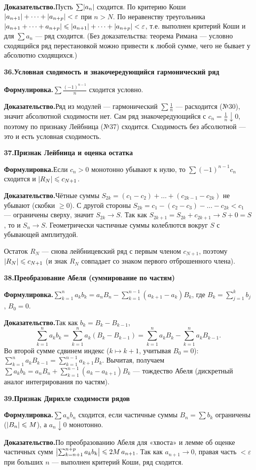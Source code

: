 \documentclass[10pt,a4paper]{article}
\newcommand{\eps}{\varepsilon}
\renewcommand{\le}{\leqslant}
\renewcommand{\ge}{\geqslant}
\DeclarePairedDelimiter{\abs}{\lvert}{\rvert}
\theoremstyle{definition}
\theoremstyle{plain}
\newcommand{\writespace}{\vspace{7.5mm}}
\newcommand{\prf}[2]{%
  \par\writespace\noindent
  {\large\bfseries\color{accent}#1.\enspace #2}\par\smallskip}
\newcommand{\stmt}{\par\noindent\textbf{Формулировка.}\enspace}
\newcommand{\dok}{\par\noindent\textbf{Доказательство.}\enspace}
\begin{document}
\dok Пусть $\sum\abs{a_n}$ сходится. По критерию Коши $\abs{a_{n+1}}+\dots+\abs{a_{n+p}}<\eps$ при
$n>N$. По неравенству треугольника $\abs{a_{n+1}+\dots+a_{n+p}}\le\abs{a_{n+1}}+\dots+\abs{a_{n+p}}<\eps$,
т.е. выполнен критерий Коши и для $\sum a_n$ — ряд сходится. (Без доказательства: теорема Римана —
условно сходящийся ряд перестановкой можно привести к любой сумме, чего не бывает у абсолютно
сходящихся.)

\prf{36}{Условная сходимость и знакочередующийся гармонический ряд}
\stmt $\sum\tfrac{(-1)^{n-1}}{n}$ сходится условно.

\dok Ряд из модулей — гармонический $\sum\tfrac1n$ — расходится (№30), значит абсолютной сходимости
нет. Сам ряд знакочередующийся с $c_n=\tfrac1n\downarrow0$, поэтому по признаку Лейбница (№37)
сходится. Сходимость без абсолютной — это и есть условная сходимость.

\prf{37}{Признак Лейбница и оценка остатка}
\stmt Если $c_n>0$ монотонно убывают к нулю, то $\sum(-1)^{n-1}c_n$ сходится и $\abs{R_N}\le c_{N+1}$.

\dok Чётные суммы $S_{2k}=(c_1-c_2)+\dots+(c_{2k-1}-c_{2k})$ не убывают (скобки $\ge0$). С другой
стороны $S_{2k}=c_1-(c_2-c_3)-\dots-c_{2k}<c_1$ — ограничены сверху, значит $S_{2k}\to S$. Так как
$S_{2k+1}=S_{2k}+c_{2k+1}\to S+0=S$, то и $S_n\to S$. Геометрически частичные суммы колеблются
вокруг $S$ с убывающей амплитудой.

Остаток $R_N$ — снова лейбницевский ряд с первым членом
$c_{N+1}$, поэтому $\abs{R_N}\le c_{N+1}$ (и знак $R_N$ совпадает со знаком первого отброшенного
члена).

\prf{38}{Преобразование Абеля (суммирование по частям)}
\stmt $\displaystyle\sum_{k=1}^n a_k b_k=a_n B_n-\sum_{k=1}^{n-1}(a_{k+1}-a_k)B_k$, где
$B_k=\sum_{j=1}^k b_j$, $B_0=0$.

\dok Так как $b_k=B_k-B_{k-1}$,
\[
  \sum_{k=1}^n a_k b_k=\sum_{k=1}^n a_k(B_k-B_{k-1})
  =\sum_{k=1}^n a_k B_k-\sum_{k=1}^n a_k B_{k-1}.
\]
Во второй сумме сдвинем индекс ($k\mapsto k+1$, учитывая $B_0=0$):
$\sum_{k=1}^n a_k B_{k-1}=\sum_{k=1}^{n-1}a_{k+1}B_k$. Вычитая, получаем
$\sum a_k b_k=a_n B_n+\sum_{k=1}^{n-1}(a_k-a_{k+1})B_k$ — тождество Абеля (дискретный аналог
интегрирования по частям).

\prf{39}{Признак Дирихле сходимости рядов}
\stmt $\sum a_n b_n$ сходится, если частичные суммы $B_n=\sum b_k$ ограничены ($\abs{B_n}\le M$), а
$a_n\downarrow0$ монотонно.

\dok По преобразованию Абеля для «хвоста» и лемме об оценке частичных сумм
$\abs[\big]{\sum_{k=n+1}^{n+p}a_k b_k}\le 2M\,a_{n+1}$. Так как $a_{n+1}\to0$, правая часть $<\eps$
при больших $n$ — выполнен критерий Коши, ряд сходится.
\end{document}
